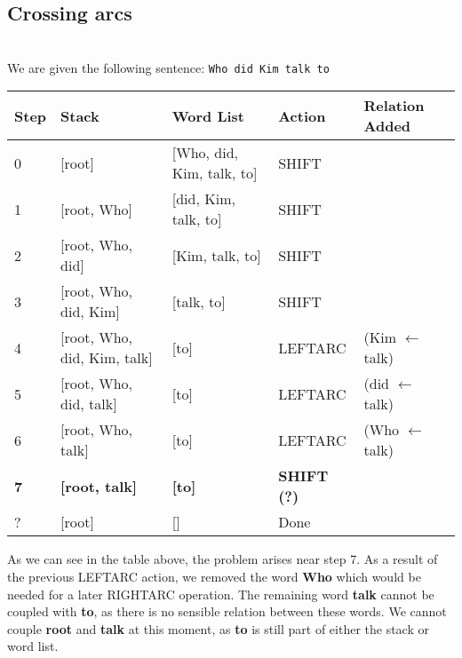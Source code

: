 \documentclass[a4paper, 11pt]{article}
\begin{document}
\subsection{Crossing arcs}

\noindent{}\\

We are given the following sentence: \texttt{Who did Kim talk to}\\

	\begin{table}[h]
	\begin{tabular}{l|l|l|l|l}
		Step & Stack & Word List & Action & Relation Added \\ \hline
		0	& [root] & [Who, did, Kim, talk, to] & SHIFT &  \\
		1	& [root, Who] & [did, Kim, talk, to] & SHIFT &  \\
		2	& [root, Who, did] & [Kim, talk, to] & SHIFT &  \\
		3	& [root, Who, did, Kim] & [talk, to] & SHIFT &  \\
		4	& [root, Who, did, Kim, talk] & [to] & LEFTARC & (Kim $\leftarrow$ talk) \\
		5	& [root, Who, did, talk] & [to] & LEFTARC & (did $\leftarrow$ talk) \\
		6	& [root, Who, talk] & [to] & LEFTARC & (Who $\leftarrow$ talk) \\
		\textbf{7}	& \textbf{[root, talk]} &\textbf{ [to]} & \textbf{SHIFT (?)} &  \\
		? & [root] & [] & Done &
	\end{tabular}
	\centering
	\end{table}

As we can see in the table above, the problem arises near step 7. As a result of the previous LEFTARC action, we removed the word \textbf{Who} which would be needed for a later RIGHTARC operation. The remaining word \textbf{talk} cannot be coupled with \textbf{to}, as there is no sensible relation between these words. We cannot couple \textbf{root} and \textbf{talk} at this moment, as \textbf{to} is still part of either the stack or word list.
\end{document}
